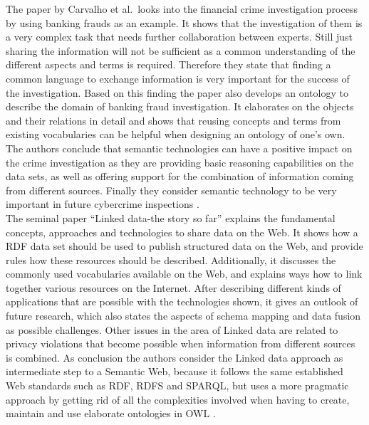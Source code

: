 The paper by Carvalho et al.\ looks into the financial crime investigation process by using banking frauds as an example. It shows that the investigation of them is a very complex task that needs further collaboration between experts. Still just sharing the information will not be sufficient as a common understanding of the different aspects and terms is required. Therefore they state that finding a common language to exchange information is very important for the success of the investigation. Based on this finding the paper also develops an ontology to describe the domain of banking fraud investigation. It elaborates on the objects and their relations in detail and shows that reusing concepts and terms from existing vocabularies can be helpful when designing an ontology of one's own. The authors conclude that semantic technologies can have a positive impact on the crime investigation as they are providing basic reasoning capabilities on the data sets, as well as offering support for the combination of information coming from different sources. Finally they consider semantic technology to be very important in future cybercrime inspections \citep{carvalhoapplying}. \\

The seminal paper ``Linked data-the story so far'' explains the fundamental concepts, approaches and technologies to share data on the Web. It shows how a \gls{RDF} data set should be used to publish structured data on the Web, and provide rules how these resources should be described. Additionally, it discusses the commonly used vocabularies available on the Web, and explains ways how to link together various resources on the Internet. After describing different kinds of applications that are possible with the technologies shown, it gives an outlook of future research, which also states the aspects of schema mapping and data fusion as possible challenges. Other issues in the area of Linked data are related to privacy violations that become possible when information from different sources is combined. As conclusion the authors consider the Linked data approach as intermediate step to a Semantic Web, because it follows the same established Web standards such as \gls{RDF}, \gls{RDFS} and \gls{SPARQL}, but uses a more pragmatic approach by getting rid of all the complexities involved when having to create, maintain and use elaborate ontologies in \gls{OWL} \citep{bizer2009linked}. \\

